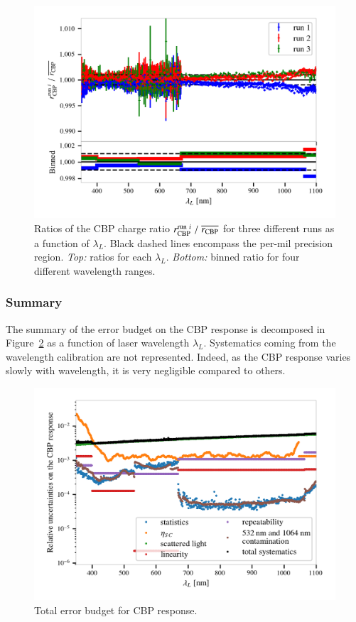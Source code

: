 \begin{figure}[h]
    \centering
    \includegraphics[width=\columnwidth]{fig/sc_runi_ratios.png}
    \caption{Ratios of the CBP charge ratio $r_{\rm CBP}^{\mathrm{run}\ i}\;/\;\overline{r_{\rm CBP}}$ for three different runs as a function of $\lambda_L$. Black dashed lines encompass the per-mil precision region. \textit{Top:} ratios for each $\lambda_L$. \textit{Bottom:} binned ratio for four different wavelength ranges.}
    \label{fig:SCrepeatability}
\end{figure}

\subsubsection{Summary}\label{sec:cbp_summary}

The summary of the error budget on the CBP response is decomposed in Figure~\ref{fig:cbp_budget} as a function of laser wavelength $\lambda_L$. Systematics coming from the wavelength calibration are not represented. Indeed, as the CBP response varies slowly with wavelength, it is very negligible compared to others. 

\begin{figure}[h]
    \centering
    \includegraphics[width=\columnwidth]{fig/cbp_error_budget.png}
    \caption{Total error budget for CBP response.}
    \label{fig:cbp_budget}
\end{figure}

